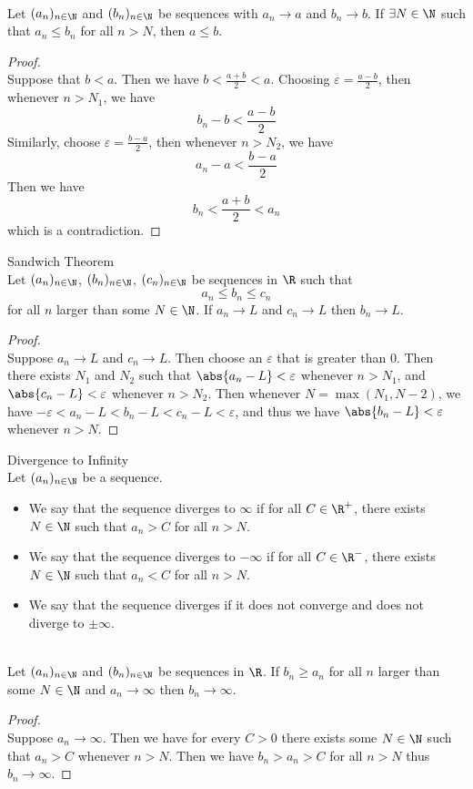 \documentclass[a4paper]{article}
\begin{document}
\begin{prp}{}{}\\ Let $(a_n)_{n\in\N}$ and $(b_n)_{n\in\N}$ be sequences with $a_n\to a$ and $b_n\to b$. If $\exists N\in\N$ such that $a_n\leq b_n$ for all $n>N$, then $a\leq b$. 
\begin{proof}\\ Suppose that $b<a$. Then we have $b<\frac{a+b}{2}<a$. Choosing $\varepsilon=\frac{a-b}{2}$, then whenever $n>N_1$, we have $$b_n-b<\frac{a-b}{2}$$ Similarly, choose $\varepsilon=\frac{b-a}{2}$, then whenever $n>N_2$, we have $$a_n-a<\frac{b-a}{2}$$ Then we have $$b_n<\frac{a+b}{2}<a_n$$ which is a contradiction. 
\end{proof}
\end{prp}

\begin{prp}{Sandwich Theorem}{}\\ Let $(a_n)_{n\in\N}$, $(b_n)_{n\in\N}$, $(c_n)_{n\in\N}$ be sequences in $\R$ such that $$a_n\leq b_n\leq c_n$$ for all $n$ larger than some $N\in\N$. If $a_n\to L$ and $c_n\to L$ then $b_n\to L$. 
\begin{proof}\\ Suppose $a_n\to L$ and $c_n\to L$. Then choose an $\varepsilon$ that is greater than $0$. Then there exists $N_1$ and $N_2$ such that $\abs{a_n-L}<\varepsilon$ whenever $n>N_1$, and $\abs{c_n-L}<\varepsilon$ whenever $n>N_2$. Then whenever $N=\max{(N_1,N-2)}$, we have $-\varepsilon<a_n-L<b_n-L<c_n-L<\varepsilon$, and thus we have $\abs{b_n-L}<\varepsilon$ whenever $n>N$. 
\end{proof}
\end{prp}

\begin{defn}{Divergence to Infinity}{}\\
Let $(a_n)_{n\in\N}$ be a sequence. 
\begin{itemize}
\item We say that the sequence diverges to $\infty$ if for all $C\in\R^+$, there exists $N\in\N$ such that $a_n>C$ for all $n>N$. 
\item We say that the sequence diverges to $-\infty$ if for all $C\in\R^-$, there exists $N\in\N$ such that $a_n<C$ for all $n>N$. 
\item We say that the sequence diverges if it does not converge and does not diverge to $\pm\infty$. 
\end{itemize}
\end{defn}

\begin{prp}{}{}\\ Let $(a_n)_{n\in\N}$ and $(b_n)_{n\in\N}$ be sequences in $\R$. If $b_n\geq a_n$ for all $n$ larger than some $N\in\N$ and $a_n\to\infty$ then $b_n\to\infty$. 
\begin{proof}\\ Suppose $a_n\to\infty$. Then we have for every $C>0$ there exists some $N\in\N$ such that $a_n>C$ whenever $n>N$. Then we have $b_n>a_n>C$ for all $n>N$ thus $b_n\to\infty$. 
\end{proof}
\end{prp}
\end{document}
